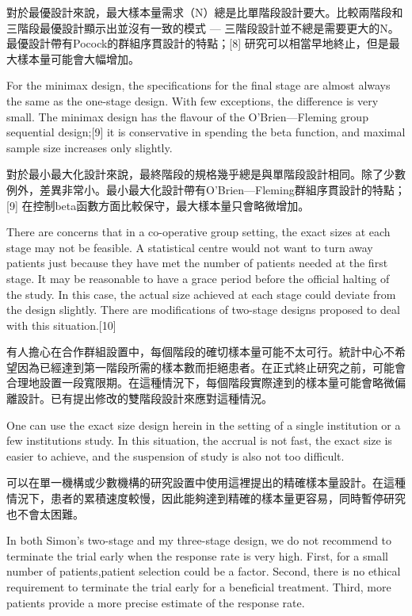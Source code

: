 對於最優設計來說，最大樣本量需求（N）總是比單階段設計要大。比較兩階段和三階段最優設計顯示出並沒有一致的模式 — 三階段設計並不總是需要更大的N。最優設計帶有Pocock的群組序貫設計的特點；[8] 研究可以相當早地終止，但是最大樣本量可能會大幅增加。

For the minimax design, the specifications for the final stage are almost always the same as the one-stage design. With few exceptions, the difference is very small. The minimax design has the flavour of the O’Brien—Fleming group sequential design;[9] it is conservative in spending the beta function, and maximal sample size increases only slightly.

對於最小最大化設計來說，最終階段的規格幾乎總是與單階段設計相同。除了少數例外，差異非常小。最小最大化設計帶有O’Brien—Fleming群組序貫設計的特點；[9] 在控制beta函數方面比較保守，最大樣本量只會略微增加。

There are concerns that in a co-operative group setting, the exact sizes at each stage may not be feasible. A statistical centre would not want to turn away patients just because they have met the number of patients needed at the first stage. It may be reasonable to have a grace period before the official halting of the study. In this case, the actual size achieved at each stage could deviate from the design slightly. There are modifications of two-stage designs proposed to deal with this situation.[10]

有人擔心在合作群組設置中，每個階段的確切樣本量可能不太可行。統計中心不希望因為已經達到第一階段所需的樣本數而拒絕患者。在正式終止研究之前，可能會合理地設置一段寬限期。在這種情況下，每個階段實際達到的樣本量可能會略微偏離設計。已有提出修改的雙階段設計來應對這種情況。

One can use the exact size design herein in the setting of a single institution or a few institutions study. In this situation, the accrual is not fast, the exact size is easier to achieve, and the suspension of study is also not too difficult.

可以在單一機構或少數機構的研究設置中使用這裡提出的精確樣本量設計。在這種情況下，患者的累積速度較慢，因此能夠達到精確的樣本量更容易，同時暫停研究也不會太困難。

In both Simon’s two-stage and my three-stage design, we do not recommend to terminate the trial early when the response rate is very high. First, for a small number of patients,patient selection could be a factor. Second, there is no ethical requirement to terminate the trial early for a beneficial treatment. Third, more patients provide a more precise estimate of the response rate.

